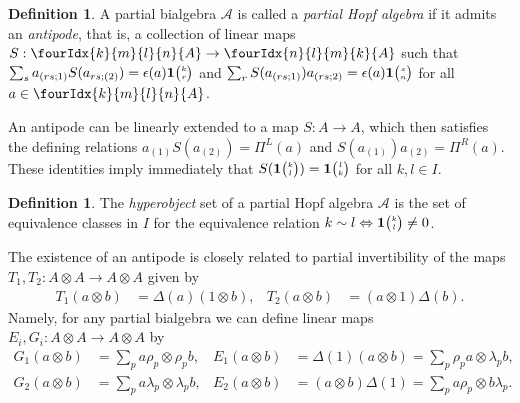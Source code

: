 \documentclass[10pt]{article}
\newcommand{\Grt}[3]{#1{\tiny {\begin{pmatrix} #2\\#3\end{pmatrix}}}}
\newcommand{\UnitC}[2]{\Grt{\mathbf{1}}{#1}{#2}}
\newcommand{\Gr}[5]{\fourIdx{#2}{#4}{#3}{#5}{#1}}%
\theoremstyle{definition}
\newtheorem{Def}[Theorem]{Definition}
\newtheorem{Rem}[Theorem]{Remark}
\numberwithin{equation}{section}
\begin{document}
\begin{Def}\label{DefPartBiAlgAnt}A partial bialgebra $\mathscr{A}$ is called a \emph{partial Hopf algebra} if it admits an \emph{antipode}, that is, a collection of linear
maps $S:\Gr{A}{k}{l}{m}{n}\rightarrow \Gr{A}{n}{m}{l}{k}$ such that $\sum_s a_{(rs;1)}S(a_{rs;(2)})= \epsilon(a)\UnitC{k}{r}$ and $\sum_r S(a_{(rs;1)})a_{(rs;2)}= \epsilon(a)\UnitC{s}{n}$ for all $a \in \Gr{A}{k}{l}{m}{n}$.
   
\end{Def} 


An antipode can be linearly extended to a map $S: A\rightarrow A$, which then satisfies the defining relations $a_{(1)}S(a_{(2)}) = \Pi^{L}(a)$ and $
 S(a_{(1)})a_{(2)} = \Pi^{R}(a)$. These identities imply immediately that $S(\UnitC{k}{l}) = \UnitC{l}{k}$ for all $k,l\in I$.
\begin{Def} \label{remark:index-equivalence}
The \emph{hyperobject} set of a partial Hopf algebra $\mathscr{A}$ is the set of equivalence classes in $I$ for the equivalence relation $
    k \sim l \Leftrightarrow \UnitC{k}{l} \neq 0$.
\end{Def} 


The existence of an antipode is closely related to partial invertibility of
the maps $T_{1},T_{2} \colon A \otimes A \to A\otimes A$ given by
\begin{align} \label{eq:wt-12}
  T_{1} (a\otimes b)&= \Delta(a)(1 \otimes b), &
  T_{2} (a\otimes b)&= (a \otimes 1)\Delta(b).
 \end{align}
Namely, for any partial bialgebra we can define linear maps $E_{i},G_{i}
 \colon A\otimes A\to A\otimes A$ by
\begin{align} \label{eq:e1g1}
  G_{1}(a\otimes b) &=
 \sum_{p} a\rho_{p} \otimes \rho_{p}b, &  E_{1}(a \otimes b) &=\Delta(1)(a\otimes b)=\sum_{p} \rho_{p}a\otimes \lambda_{p}b, \\ \label{eq:e2g2}
 G_{2}(a \otimes b) &= \sum_{p} a\lambda_{p} \otimes
    \lambda_{p}b, &
E_{2}(a\otimes b) &= (a\otimes b)\Delta(1)=\sum_{p} a\rho_{p} \otimes b\lambda_{p}.
\end{align}
\end{document}
